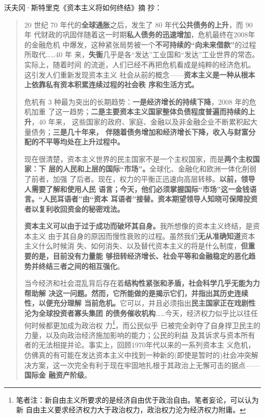 沃夫冈·斯特里克《资本主义将如何终结》\cite{JJDK201504024}\cite{streeck2017will}摘
抄：
\begin{quotation}
  20 世纪 70 年代的\textbf{全球通胀}之后，发生了 80 年代\textbf{公共债务的上升}，而 90 年
  代财政的巩固伴随着这一时期\textbf{私人债务的迅速增加}，危机最终在2008年的金融危机
  中爆发，这种紧张局势被一个\textbf{不可持续的“向未来借款”}的过程所取代……40 年
  来，\textbf{失衡}几乎是各“发达”工业国和“发达”工业世界的常态。实际上，随着时间
  的流逝，人们已经不再把危机看成是纯粹的经济危机。这引发人们重新发现资本主义
  社会从前的概念——\textbf{资本主义是一种从根本上依靠私有资本积累连续过程的社会秩
    序和生活方式。}

  危机有 3 种最为突出的长期趋势：\textbf{一是经济增长的持续下降}，2008 年的危机加重
  了这一趋势；\textbf{二是主要资本主义国家整体负债程度普遍而持续的上升}，40 年来，
  这些国家的政府、家庭、金融以及非金融企业不断累积起大量债务；\textbf{三是几十年来，
    伴随着债务增加和经济增长下降，收入与财富分配的不平等均处在上升过程中。}

  现在很清楚，资本主义世界的民主国家不是一个主权国家，而是\textbf{两个主权国家：下
    层的人民和上层的国际“市场”。}全球化、金融化和欧洲一体化削弱了前者，加强
  了后者。现在，权力的平衡正迅速向高层转移。\textbf{以前，领导人需要了解和使用人民
    语言；今天，他们必须掌握国际“市场”这一金钱语言。“人民耳语者”由“资本
    耳语者”接替。资本期望领导人知晓可保障投资者以复利收回资金的秘密戏法。}

  \textbf{资本主义可以由于过于成功而破坏其自身。}我所想像的资本主义终结，是资本主义
  由于其自身的原因而慢性衰败的过程。虽然我们\textbf{无从准确知道}资本主义什么时候消
  失、如何消失、以及替代资本主义的将是什么制度，\textbf{但重要的是，目前没有力量能
    够扭转经济增长、社会平等和金融稳定的恶化趋势并终结三者之间的相互强化}。

  当今经济和社会混乱背后存在着\textbf{结构性紧张和矛盾，社会科学几乎无能为力帮助解
    决这一问题。然而，它所能做的是揭示它们，并指出其历史连续性，以便充分理解
    当前危机。}它可以，并且必须指出\textbf{民主国家正在戏剧性沦为全球投资者寡头集团
    的债务催收机构}……今天，经济权力似乎比以往任何时候都更加成为政治权
  力\footnote{笔者注：新自由主义所要求的是经济自由优于政治自由。笔者妄论，可以认为新
    自由主义要求经济权力大于政治权力，政治权力沦为经济权力附庸。}，而公民似乎
  已被完全剥夺了自身捍卫民主的力量，以及向政治经济施加影响的能力；公民的利益
  及其诉求与资本所有者的无法相提并论。事实上，回顾1970年代以来的一系列资本主
  义危机，仿佛真的有可能在发达资本主义中找到一种新的(即使是暂时的)社会冲突解
  决方案，这一次完全有利于现在牢固地扎根于其政治上无懈可击的据点——\textbf{国际金
    融资产阶级}。
\end{quotation}

